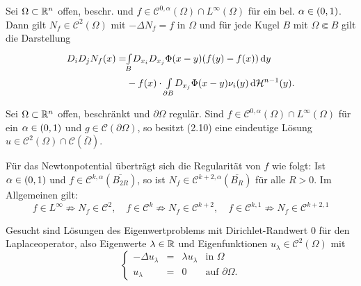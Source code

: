 \documentclass{cheat-sheet}
\newcommand{\HM}{\mathcal{H}} %
\begin{document}

\begin{satz}[Hölder] %
  Sei $\Omega \subset \mathbb{R}^n$ offen, beschr. und $f \in \mathcal{C}^{0,\alpha}(\Omega) \cap L^\infty(\Omega)$ für ein bel. $\alpha \in \left( 0, 1 \right)$. Dann gilt $N_f \in \mathcal{C}^2(\Omega)$ mit $- \Delta N_f = f$ in $\Omega$ und für jede Kugel $B$ mit $\Omega \Subset B$ gilt die Darstellung
  \begin{align*}
    D_i D_j N_f(x) = &\Int{B}{}{D_{x_i} D_{x_j} \Phi(x-y) (f(y) - f(x))}{y}\\
    & - f(x) \cdot \Int{\partial B}{}{D_{x_j} \Phi(x-y) \nu_i(y)}{\HM^{n-1}(y)}.
  \end{align*}
\end{satz}

\begin{satz}
  Sei $\Omega \subset \mathbb{R}^n$ offen, beschränkt und $\partial \Omega$ regulär. Sind $f \in \mathcal{C}^{0,\alpha}(\Omega) \cap L^\infty(\Omega)$ für ein $\alpha \in \left( 0, 1 \right)$ und $g \in \mathcal{C}(\partial \Omega)$, so besitzt (2.10) eine eindeutige Lösung $u \in \mathcal{C}^2(\Omega) \cap \mathcal{C}(\overline{\Omega})$.
\end{satz}

\begin{bem}
  Für das Newtonpotential überträgt sich die Regularität von $f$ wie folgt: Ist $\alpha \in \left( 0, 1 \right)$ und $f \in \mathcal{C}^{k,\alpha}(\overline{B_{2R}})$, so ist $N_f \in \mathcal{C}^{k+2,\alpha}(\overline{B_R})$ für alle $R > 0$. Im Allgemeinen gilt:
  \[
    f {\in} L^\infty \not\Rightarrow N_f \in \mathcal{C}^2, \quad
    f {\in} \mathcal{C}^k \not\Rightarrow N_f \in \mathcal{C}^{k+2}, \quad
    f {\in} \mathcal{C}^{k,1} \not\Rightarrow N_f \in \mathcal{C}^{k+2,1}
  \]
\end{bem}



\begin{problem}
  Gesucht sind Lösungen des Eigenwertproblems mit Dirichlet-Randwert $0$ für den Laplaceoperator, also Eigenwerte $\lambda \in \mathbb{R}$ und Eigenfunktionen $u_\lambda \in \mathcal{C}^2(\Omega)$ mit
  \[
    \left\{ \begin{array}{rlll}
      - \Delta u_\lambda &=& \lambda u_\lambda & \text{in $\Omega$}\\
      u_\lambda &=& 0 & \text{auf $\partial \Omega$.}
    \end{array} \right.
  \]
\end{problem}
\end{document}
